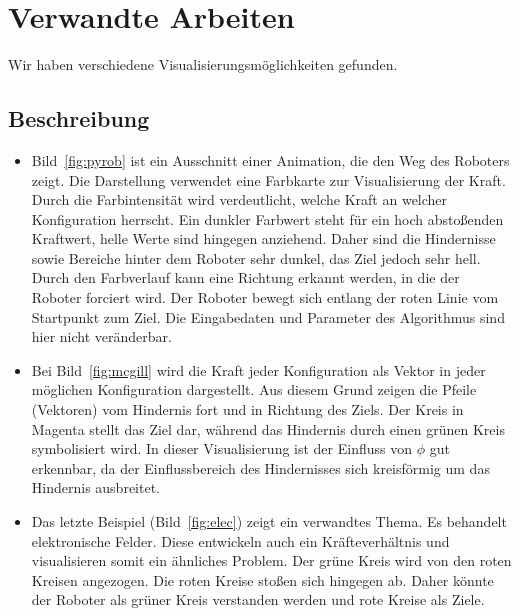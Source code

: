 \section{Verwandte Arbeiten}

Wir haben verschiedene Visualisierungsmöglichkeiten gefunden.

\subsection{Beschreibung}
\begin{itemize}
\item Bild~\vref{fig:pyrob}  ist ein Ausschnitt einer Animation, die den Weg des Roboters zeigt. Die Darstellung verwendet eine Farbkarte zur Visualisierung der Kraft. Durch die Farbintensität wird verdeutlicht, welche Kraft an welcher Konfiguration herrscht. Ein dunkler Farbwert steht für ein hoch abstoßenden Kraftwert, helle Werte sind hingegen anziehend. Daher sind die Hindernisse sowie Bereiche hinter dem Roboter sehr dunkel, das Ziel jedoch sehr hell. Durch den Farbverlauf kann eine Richtung erkannt werden, in die der Roboter forciert wird. Der Roboter bewegt sich entlang der roten Linie vom Startpunkt zum Ziel. Die Eingabedaten und Parameter des Algorithmus sind hier nicht veränderbar.
\item Bei Bild~\vref{fig:mcgill} wird die Kraft jeder Konfiguration als Vektor in jeder möglichen Konfiguration dargestellt. Aus diesem Grund zeigen die Pfeile (Vektoren) vom Hindernis fort und in Richtung des Ziels. Der Kreis in Magenta stellt das Ziel dar, während das Hindernis durch einen grünen Kreis symbolisiert wird. In dieser Visualisierung ist der Einfluss von $\phi$ gut erkennbar, da der Einflussbereich des Hindernisses sich kreisförmig um das Hindernis ausbreitet.
\item Das letzte Beispiel (Bild~\vref{fig:elec}) zeigt ein verwandtes Thema. Es behandelt elektronische Felder. Diese entwickeln auch ein Kräfteverhältnis und visualisieren somit ein ähnliches Problem. Der grüne Kreis wird von den roten Kreisen angezogen. Die roten Kreise stoßen sich hingegen ab. Daher könnte der Roboter als grüner Kreis verstanden werden und rote Kreise als Ziele.
\end{itemize}

